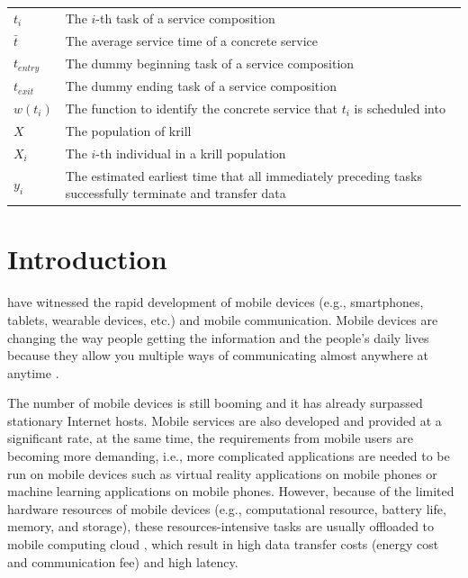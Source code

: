 \documentclass[journal]{IEEEtran}
\begin{document}
\begin{tabular}{@{} l p{7.36cm} }
$t_i$         &   The $i$-th task of a service composition \\
$\bar{t}$     &   The average service time of a concrete service \\
$t_{entry}$   &   The dummy beginning task of a service composition \\
$t_{exit}$    &   The dummy ending task of a service composition \\
$w(t_i)$      &   The function to identify the concrete service that $t_i$ is scheduled into \\
$X$           &   The population of krill \\
$X_i$         &   The $i$-th individual in a krill population \\
$y_i$         &   The estimated earliest time that all immediately preceding tasks successfully terminate and transfer data \\
\end{tabular}

\IEEEpeerreviewmaketitle

\section{Introduction}

 have witnessed the rapid development of mobile devices (e.g., smartphones, tablets, wearable devices, etc.) and mobile communication. Mobile devices are changing the way people getting the information and the people’s daily lives because they allow you multiple ways of communicating almost anywhere at anytime \cite{satyanarayanan2010mobile}.

The number of mobile devices is still booming and it has already surpassed stationary Internet hosts.
Mobile services are also developed and provided at a significant rate, at the same time, the requirements from mobile users are becoming more demanding, i.e., more complicated applications are needed to be run on mobile devices such as virtual reality applications on mobile phones \cite{bastug2017toward} or machine learning applications \cite{abadi2016TensorFlow} on mobile phones. However, because of the limited hardware resources of mobile devices (e.g., computational resource, battery life, memory, and storage), these resources-intensive tasks are usually offloaded to mobile computing cloud \cite{dinh2013survey}, which result in high data transfer costs (energy cost and communication fee) and high latency.
\end{document}
